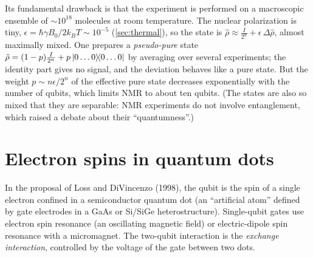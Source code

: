 Its fundamental drawback is that the experiment is performed on a macroscopic ensemble of $\sim10^{18}$ molecules at room temperature. The nuclear polarization is tiny, $\epsilon=\hbar\gamma B_0/2k_BT\sim10^{-5}$ (\cref{sec:thermal}), so the state is
$\hat\rho\approx\frac{I}{2^n}+\epsilon\,\Delta\hat\rho$, almost maximally mixed. One prepares a \emph{pseudo-pure} state $\hat\rho=(1-p)\frac I{2^n}+p\left|0\dots0\middle\rangle\!\middle\langle0\dots0\right|$ by averaging over several experiments; the identity part gives no signal, and the
deviation behaves like a pure state. But the weight $p\sim n\epsilon/2^n$ of the effective pure state decreases exponentially with the number of qubits, which limits NMR to about ten qubits. (The states are also so mixed that they are separable:
NMR experiments do not involve entanglement, which raised a debate about their ``quantumness''.)

\section{Electron spins in quantum dots}\label{sec:spinqubits}
In the proposal of Loss and DiVincenzo (1998), the qubit is the spin of a single electron confined in a semiconductor quantum dot (an ``artificial atom'' defined by gate electrodes in a GaAs or Si/SiGe heterostructure). Single-qubit gates use
electron spin resonance (an oscillating magnetic field) or electric-dipole spin resonance with a micromagnet. The two-qubit interaction is the \emph{exchange interaction}, controlled by the voltage of the gate between two dots.

